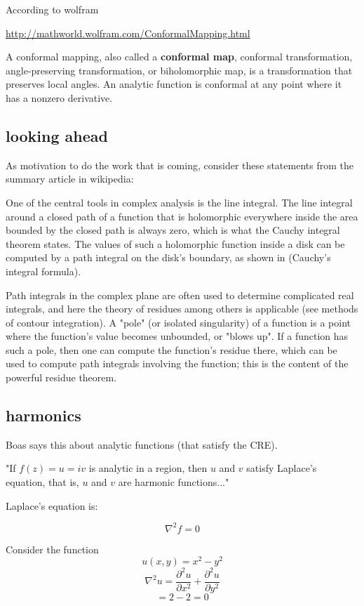 \documentclass[11pt, oneside]{article}   	%
\begin{document}
According to wolfram

\url{http://mathworld.wolfram.com/ConformalMapping.html}

A conformal mapping, also called a \textbf{conformal map}, conformal transformation, angle-preserving transformation, or biholomorphic map, is a transformation that preserves local angles. An analytic function is conformal at any point where it has a nonzero derivative.

\subsection*{looking ahead}
As motivation to do the work that is coming, consider these statements from the summary article in wikipedia:

    One of the central tools in complex analysis is the line integral. The line integral around a closed path of a function that is holomorphic everywhere inside the area bounded by the closed path is always zero, which is what the Cauchy integral theorem states. The values of such a holomorphic function inside a disk can be computed by a path integral on the disk's boundary, as shown in (Cauchy's integral formula). 
    
    Path integrals in the complex plane are often used to determine complicated real integrals, and here the theory of residues among others is applicable (see methods of contour integration). A "pole" (or isolated singularity) of a function is a point where the function's value becomes unbounded, or "blows up". If a function has such a pole, then one can compute the function's residue there, which can be used to compute path integrals involving the function; this is the content of the powerful residue theorem.
    
\subsection*{harmonics}
Boas says this about analytic functions (that satisfy the CRE).

"If $f(z) = u = iv$ is analytic in a region, then $u$ and $v$ satisfy Laplace's equation, that is, $u$ and $v$ are harmonic functions..."

Laplace's equation is:

\[ \nabla^2 f = 0 \]

Consider the function 
\[ u(x,y) = x^2 - y^2 \]
\[ \nabla^2 u = \frac{\partial^2 u}{\partial x^2} +  \frac{\partial^2 u}{\partial y^2} \]
\[ = 2 - 2 = 0 \]
\end{document}
